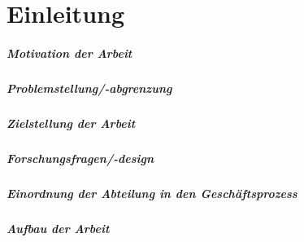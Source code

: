 \acresetall 
\chapter{Einleitung}
\paragraph{Motivation der Arbeit}

\paragraph{Problemstellung/-abgrenzung}

\paragraph{Zielstellung der Arbeit}

\paragraph{Forschungsfragen/-design}

\paragraph{Einordnung der Abteilung in den Geschäftsprozess} 

\paragraph{Aufbau der Arbeit}

